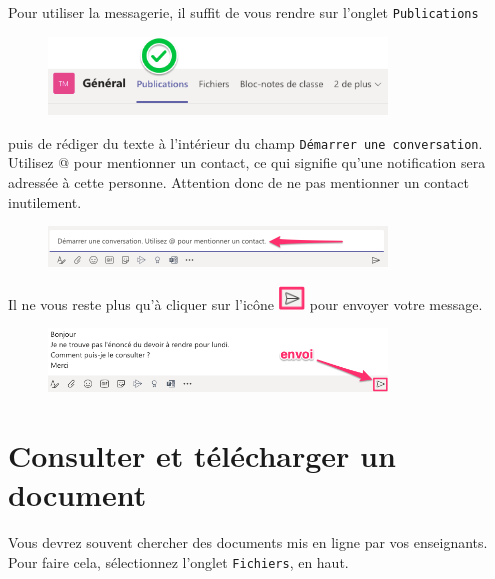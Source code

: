 Pour utiliser la messagerie, il suffit de vous rendre sur l'onglet \texttt{Publications}

\begin{figure}[H]
\includegraphics[width=9cm]{./images/teams/publications}
\centering
\end{figure}

puis de rédiger du texte à l'intérieur du champ \texttt{Démarrer une conversation}. Utilisez @ pour mentionner un contact, ce qui signifie qu'une notification sera adressée à cette personne. Attention donc de ne pas mentionner un contact inutilement.

\begin{figure}[H]
\includegraphics[width=9cm]{./images/teams/publications2}
\centering
\end{figure}

Il ne vous reste plus qu'à cliquer sur l'icône \includegraphics[width=0.7cm]{./images/teams/envoi_message} pour envoyer votre message.

\begin{figure}[H]
\includegraphics[width=9cm]{./images/teams/publications3}
\centering
\end{figure}





\section{Consulter et télécharger un document}\label{teamsConsulterTelecharger}

Vous devrez souvent chercher des documents mis en ligne par vos enseignants. Pour faire cela, sélectionnez l'onglet \texttt{Fichiers}, en haut.

